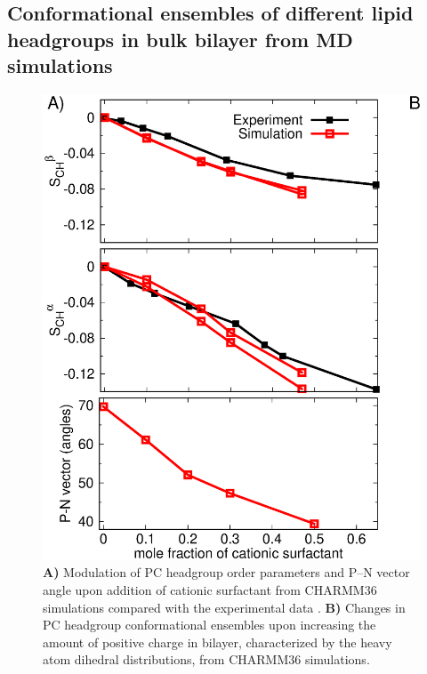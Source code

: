 \documentclass[aps,prl,superscriptaddress,twocolumn]{revtex4}
\begin{document}
\subsection{Conformational ensembles of different lipid headgroups in bulk bilayer from MD simulations}

\begin{figure}[bt]
  \centering
  \includegraphics[width=18.0cm]{./Figs/HGorderparametersPCvsSURFchangeDIHEDRALS.eps}
  \caption{\label{changesWITHsurf}
    \textbf{A)} Modulation of PC headgroup order parameters and P--N vector angle upon addition of cationic surfactant
    from CHARMM36 simulations compared with the experimental data \cite{scherer89}.
    \textbf{B)} Changes in PC headgroup conformational ensembles upon increasing the amount of positive charge in bilayer,
    characterized by the heavy atom dihedral distributions, from CHARMM36 simulations.
  }
\end{figure}
\end{document}
